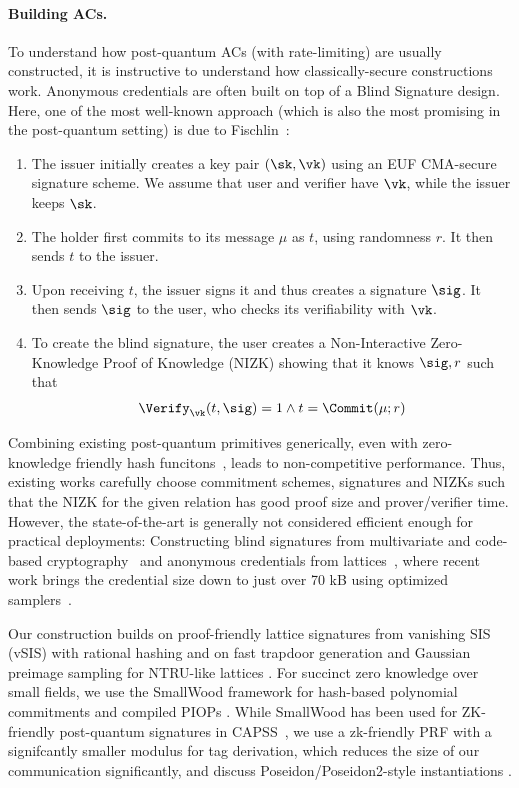 \paragraph*{Building ACs.}
To understand how post-quantum ACs (with rate-limiting) are usually  constructed, it is instructive to understand how  classically-secure constructions work. 
Anonymous credentials are often built on top of a Blind Signature design. Here, one of the most well-known approach (which is also the most promising in the post-quantum setting) is due to Fischlin~\cite{C:Fischlin06}:
\begin{enumerate}
	\item The issuer initially creates a key pair $(\sk,\vk)$ using an EUF CMA-secure signature scheme. We assume that user and verifier have $\vk$, while the issuer keeps $\sk$.
	\item The holder first commits to its message $\mu$ as \(t\), using randomness $r$. It then sends $t$ to the issuer.
	\item Upon receiving $t$, the issuer signs it and thus  creates a signature $\sig$. It then sends $\sig$ to the user, who checks its verifiability with $\vk$.
	\item To create the blind signature, the user creates a Non-Interactive Zero-Knowledge Proof of Knowledge (NIZK) showing that it knows $\sig,r$ such that $$\Verify_{\vk}(t,\sig)=1 \land t= \Commit(\mu;r)$$
\end{enumerate}
Combining existing post-quantum primitives generically, even with zero-knowledge friendly hash funcitons~\cite{EPRINT:PWFW23}, leads to non-competitive performance. Thus, existing works  carefully choose commitment schemes, signatures and NIZKs such that the NIZK for the given relation has good proof size and prover/verifier time. However, the state-of-the-art is generally not considered efficient enough for practical deployments:
Constructing blind signatures from multivariate and code-based
cryptography~\cite{EPRINT:BFMRSV25} and anonymous credentials from
lattices~\cite{EPRINT:LCLLW23}, where recent work brings the credential size
down to just over 70 kB using optimized samplers~\cite{C:JeuRouSan23,AC:JeuSan25}. 

Our construction builds on proof-friendly lattice signatures from vanishing SIS (vSIS) with rational hashing
\cite{EPRINT:DKLW25,PKC:DKLW25} and on fast trapdoor generation and Gaussian preimage sampling for NTRU-like
lattices \cite{EPRINT:ENSTW23}. For succinct zero knowledge over small fields, we use the SmallWood framework
for hash-based polynomial commitments and compiled PIOPs \cite{EPRINT:FenRiv25b}. 
While SmallWood has been used for ZK-friendly post-quantum signatures in CAPSS~\cite{EPRINT:FenRiv25a}, we use a zk-friendly PRF with a signifcantly smaller modulus for tag derivation, which reduces the size of our communication significantly, and discuss Poseidon/Poseidon2-style instantiations \cite{USENIX:GKRRS21,AFRICACRYPT:GraKhoSch23}.




